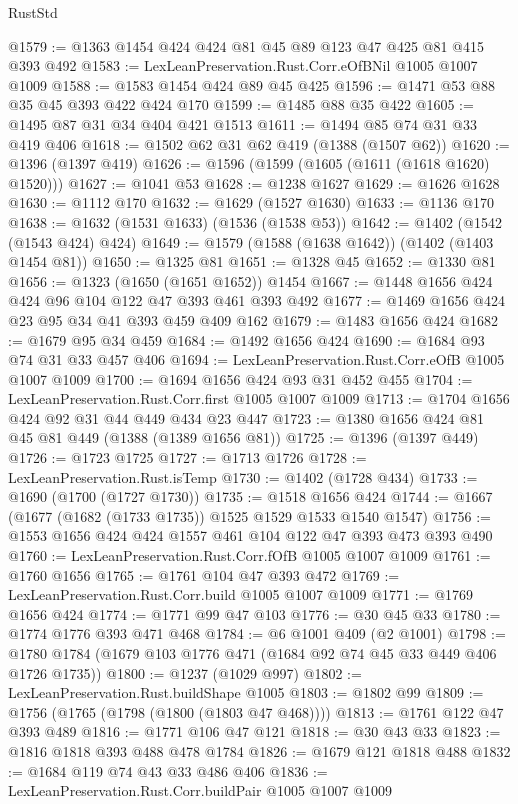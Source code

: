 \begin{lexlean}{RustStd}
\begin{coremodule}
@1579 := @1363 @1454 @424 @424 @81 @45 @89 @123 @47 @425 @81 @415 @393 @492
@1583 := LexLeanPreservation.Rust.Corr.eOfBNil @1005 @1007 @1009
@1588 := @1583 @1454 @424 @89 @45 @425
@1596 := @1471 @53 @88 @35 @45 @393 @422 @424 @170
@1599 := @1485 @88 @35 @422
@1605 := @1495 @87 @31 @34 @404 @421 @1513
@1611 := @1494 @85 @74 @31 @33 @419 @406
@1618 := @1502 @62 @31 @62 @419 (@1388 (@1507 @62))
@1620 := @1396 (@1397 @419)
@1626 := @1596 (@1599 (@1605 (@1611 (@1618 @1620) @1520)))
@1627 := @1041 @53
@1628 := @1238 @1627
@1629 := @1626 @1628
@1630 := @1112 @170
@1632 := @1629 (@1527 @1630)
@1633 := @1136 @170
@1638 := @1632 (@1531 @1633) (@1536 (@1538 @53))
@1642 := @1402 (@1542 (@1543 @424) @424)
@1649 := @1579 (@1588 (@1638 @1642)) (@1402 (@1403 @1454 @81))
@1650 := @1325 @81
@1651 := @1328 @45
@1652 := @1330 @81
@1656 := @1323 (@1650 (@1651 @1652)) @1454
@1667 := @1448 @1656 @424 @424 @96 @104 @122 @47 @393 @461 @393 @492
@1677 := @1469 @1656 @424 @23 @95 @34 @41 @393 @459 @409 @162
@1679 := @1483 @1656 @424
@1682 := @1679 @95 @34 @459
@1684 := @1492 @1656 @424
@1690 := @1684 @93 @74 @31 @33 @457 @406
@1694 := LexLeanPreservation.Rust.Corr.eOfB @1005 @1007 @1009
@1700 := @1694 @1656 @424 @93 @31 @452 @455
@1704 := LexLeanPreservation.Rust.Corr.first @1005 @1007 @1009
@1713 := @1704 @1656 @424 @92 @31 @44 @449 @434 @23 @447
@1723 := @1380 @1656 @424 @81 @45 @81 @449 (@1388 (@1389 @1656 @81))
@1725 := @1396 (@1397 @449)
@1726 := @1723 @1725
@1727 := @1713 @1726
@1728 := LexLeanPreservation.Rust.isTemp
@1730 := @1402 (@1728 @434)
@1733 := @1690 (@1700 (@1727 @1730))
@1735 := @1518 @1656 @424
@1744 := @1667 (@1677 (@1682 (@1733 @1735)) @1525 @1529 @1533 @1540 @1547)
@1756 := @1553 @1656 @424 @424 @1557 @461 @104 @122 @47 @393 @473 @393 @490
@1760 := LexLeanPreservation.Rust.Corr.fOfB @1005 @1007 @1009
@1761 := @1760 @1656
@1765 := @1761 @104 @47 @393 @472
@1769 := LexLeanPreservation.Rust.Corr.build @1005 @1007 @1009
@1771 := @1769 @1656 @424
@1774 := @1771 @99 @47 @103
@1776 := @30 @45 @33
@1780 := @1774 @1776 @393 @471 @468
@1784 := @6 @1001 @409 (@2 @1001)
@1798 := @1780 @1784 (@1679 @103 @1776 @471 (@1684 @92 @74 @45 @33 @449 @406 @1726 @1735))
@1800 := @1237 (@1029 @997)
@1802 := LexLeanPreservation.Rust.buildShape @1005
@1803 := @1802 @99
@1809 := @1756 (@1765 (@1798 (@1800 (@1803 @47 @468))))
@1813 := @1761 @122 @47 @393 @489
@1816 := @1771 @106 @47 @121
@1818 := @30 @43 @33
@1823 := @1816 @1818 @393 @488 @478 @1784
@1826 := @1679 @121 @1818 @488
@1832 := @1684 @119 @74 @43 @33 @486 @406
@1836 := LexLeanPreservation.Rust.Corr.buildPair @1005 @1007 @1009

\end{coremodule}
\end{lexlean}
